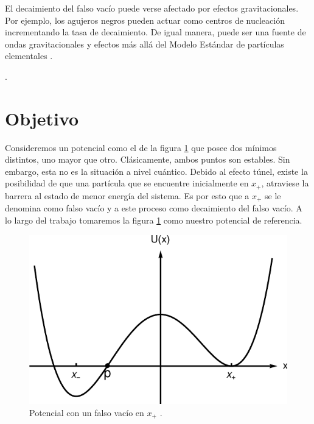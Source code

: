 El decaimiento del falso vacío puede verse afectado por efectos gravitacionales. Por ejemplo, los agujeros negros pueden actuar como centros de nucleación incrementando la tasa de decaimiento. De igual manera, puede ser una fuente de ondas gravitacionales y efectos más allá del Modelo Estándar de partículas elementales \cite{Ai:2019dqr}. 

               .

\section{Objetivo}

Consideremos un potencial como el de la figura \ref{fig:potencial} que posee dos mínimos distintos, uno mayor que otro. Clásicamente, ambos puntos son estables. Sin embargo, esta no es la situación a nivel cuántico. Debido al efecto túnel, existe la posibilidad de que una partícula que se encuentre inicialmente en $x_+$, atraviese la barrera %
al estado de menor energía del sistema. Es por esto que a $x_+$ se le denomina como falso vacío y a este proceso como decaimiento del falso vacío.
A lo largo del trabajo tomaremos la figura \ref{fig:potencial} como nuestro potencial de referencia. %

\begin{figure}[t]
	\centering
	\includegraphics[scale = 0.4]{../FIGURAS/potencial}
	\caption{Potencial con un falso vacío en $x_+$ \cite{Ai:2019dqr}.}
	\label{fig:potencial}
\end{figure}


